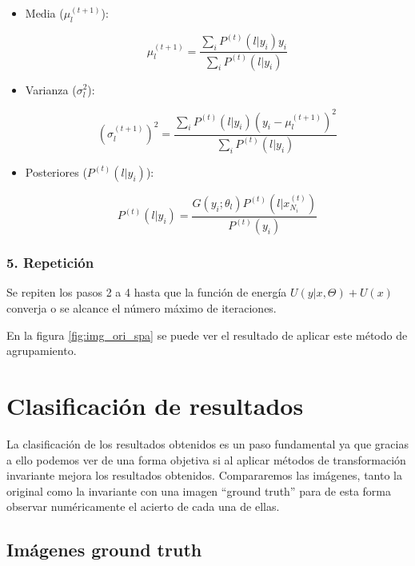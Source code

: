 \begin{itemize}
\setlength{\itemsep}{-1ex}
   \item{\begin{flushleft} Media ($\mu_l^{(t+1)}$): \end{flushleft}}

    $$\mu_l^{(t+1)} =\frac{\sum_i P^{(t)} (l|y_i )y_i }{\sum_i P^{(t)} (l|y_i )}$$

   \item{\begin{flushleft} Varianza ($\sigma_l^2$): \end{flushleft}}

    $$(\sigma_l^{(t+1)} )^2 =\frac{\sum_i P^{(t)} (l|y_i )(y_i -\mu_l^{(t+1)} )^2 }{\sum_i P^{(t)} (l|y_i )}$$

   \item{\begin{flushleft} Posteriores ($P^{(t)} (l|y_i )$): \end{flushleft}}

    $$P^{(t)} (l|y_i )=\frac{G(y_i ;\theta_l )P^{(t)} (l|x_{N_i }^{(t)} )}{P^{(t)} (y_i )}$$
\end{itemize}

\subsubsection{5. Repetición}

Se repiten los pasos 2 a 4 hasta que la función de energía $U(y|x,\Theta )+U(x)$ converja o se alcance el número máximo de iteraciones.

En la figura \ref{fig:img_ori_spa} se puede ver el resultado de aplicar este método de agrupamiento.

\section{Clasificación de resultados}\label{clasificacion-de-resultados}

La clasificación de los resultados obtenidos es un paso fundamental ya que gracias a ello podemos ver de una forma objetiva si al aplicar métodos de transformación invariante mejora los resultados obtenidos. Compararemos las imágenes, tanto la original como la invariante con una imagen ``ground truth'' para de esta forma observar numéricamente el acierto de cada una de ellas.

\subsection{Imágenes ground truth}\label{imagenes-ground-truth}

